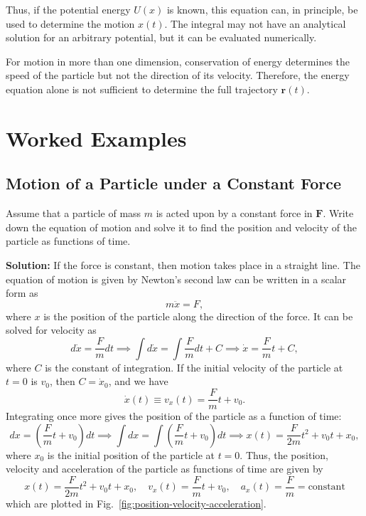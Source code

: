 \documentclass[../main.tex]{subfiles}
\begin{document}
Thus, if the potential energy $U(x)$ is known, this equation can, in principle, be used to determine the motion $x(t)$. The integral may not have an analytical solution for an arbitrary potential, but it can be evaluated numerically.

For motion in more than one dimension, conservation of energy determines the speed of the particle but not the direction of its velocity. Therefore, the energy equation alone is not sufficient to determine the full trajectory $\mathbf{r}(t)$.


\section{Worked Examples}

\subsection{\label{ex:constant-force} Motion of a Particle under a Constant Force}
Assume that a particle of mass $m$ is acted upon by a constant force in $\mathbf{F}$. Write down the equation of motion and solve it to find the position and velocity of the particle as functions of time.

\textbf{Solution:} If the force is constant, then motion takes place in a straight line. The equation of motion is given by Newton's second law can be written in a scalar form as
\begin{equation}
m\ddot{x} = F,
\end{equation}
where $x$ is the position of the particle along the direction of the force. It can be solved for velocity as
\begin{equation}
    d\dot{x} = \frac{F}{m}dt \implies \int d\dot{x} = \int \frac{F}{m}dt + C \implies \dot{x} = \frac{F}{m}t + C,
\end{equation}
where $C$ is the constant of integration. If the initial velocity of the particle at $t=0$ is $v_0$, then $C = \dot{x}_0$, and we have
\begin{equation}
    \dot{x}(t) \equiv v_x(t) = \frac{F}{m}t + v_0.
\end{equation}
Integrating once more gives the position of the particle as a function of time:
\begin{equation}
    dx = \left(\frac{F}{m}t + v_0\right)dt \implies \int dx = \int \left(\frac{F}{m}t + v_0\right)dt \implies x(t) = \frac{F}{2m}t^2 + v_0 t + x_0,
\end{equation}
where $x_0$ is the initial position of the particle at $t=0$. Thus, the position, velocity and acceleration of the particle as functions of time are given by 
\begin{equation}
    \boxed{
x(t) = \frac{F}{2m}t^2 + v_0 t + x_0, \quad v_x(t) = \frac{F}{m}t + v_0, \quad a_x(t) = \frac{F}{m}= \text{constant}
    }
    \label{eq:constant-force-motion}
\end{equation}
which are plotted in Fig.~\ref{fig:position-velocity-acceleration}.
\end{document}
